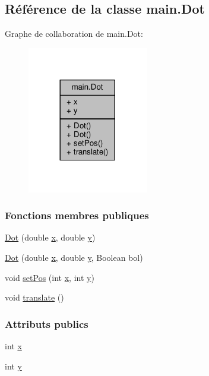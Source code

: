 \hypertarget{classmain_1_1Dot}{}\subsection{Référence de la classe main.\+Dot}
\label{classmain_1_1Dot}


Graphe de collaboration de main.\+Dot\+:\nopagebreak
\begin{figure}[H]
\begin{center}
\leavevmode
\includegraphics[width=149pt]{classmain_1_1Dot__coll__graph}
\end{center}
\end{figure}
\subsubsection*{Fonctions membres publiques}
\begin{DoxyCompactItemize}
\item 
\hyperlink{classmain_1_1Dot_a978f641727f59636f1bfc6aed8a0008a}{Dot} (double \hyperlink{classmain_1_1Dot_acfbfe11b1f5baa23f8b72bf26121d92e}{x}, double \hyperlink{classmain_1_1Dot_a34d8039b67ad611941a096e87a219fb1}{y})
\item 
\hyperlink{classmain_1_1Dot_abb292f333a2f38752bb881b3bb6e708f}{Dot} (double \hyperlink{classmain_1_1Dot_acfbfe11b1f5baa23f8b72bf26121d92e}{x}, double \hyperlink{classmain_1_1Dot_a34d8039b67ad611941a096e87a219fb1}{y}, Boolean bol)
\item 
void \hyperlink{classmain_1_1Dot_a457d705fcb68522e091d0f01a38a0bdb}{set\+Pos} (int \hyperlink{classmain_1_1Dot_acfbfe11b1f5baa23f8b72bf26121d92e}{x}, int \hyperlink{classmain_1_1Dot_a34d8039b67ad611941a096e87a219fb1}{y})
\item 
void \hyperlink{classmain_1_1Dot_ae490ac692da44edde94754ead7660aff}{translate} ()
\end{DoxyCompactItemize}
\subsubsection*{Attributs publics}
\begin{DoxyCompactItemize}
\item 
int \hyperlink{classmain_1_1Dot_acfbfe11b1f5baa23f8b72bf26121d92e}{x}
\item 
int \hyperlink{classmain_1_1Dot_a34d8039b67ad611941a096e87a219fb1}{y}
\end{DoxyCompactItemize}


